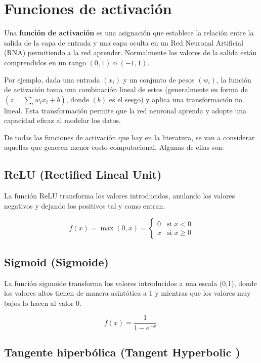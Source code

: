 \documentclass[
  us-letterpaper,
]{scrreprt}
\theoremstyle{plain}
\theoremstyle{definition}
\theoremstyle{definition}
\theoremstyle{remark}
\begin{document}
\section{Funciones de activación}\label{funciones-de-activaciuxf3n}

Una \textbf{función de activación} es una asignación que establece la
relación entre la salida de la capa de entrada y una capa oculta en un
Red Neuronal Artificial (RNA) permitiendo a la red aprender. Normalmente
los valores de la salida están comprendidos en un rango \((0,1)\) o
\((-1,1)\).

Por ejemplo, dada una entrada \((x_i)\) y un conjunto de pesos
\((w_i)\), la función de activación toma una combinación lineal de estos
(generalmente en forma de \((z = \sum_i w_i x_i + b)\), donde \((b)\) es
el sesgo) y aplica una transformación no lineal. Esta transformación
permite que la red neuronal aprenda y adopte una capacidad eficaz al
modelar los datos.

De todas las funciones de activación que hay en la literatura, se van a
considerar aquellas que generen menor costo computacional. Algunas de
ellas son:

\subsection{ReLU (Rectified Lineal Unit)}\label{sec-Relu}

La función ReLU transforma los valores introducidos, anulando los
valores negativos y dejando los positivos tal y como entran.

\[
f(x) = \max(0,x) = 
\left\{
\begin{array}{ll}
0 & \text{si } x < 0 \\
x & \text{si } x \geq 0
\end{array}
\right .
\]

\subsection{Sigmoid (Sigmoide)}\label{sigmoid-sigmoide}

La función sigmoide transforma los valores introducidos a una escala
(0,1), donde los valores altos tienen de manera asintótica a 1 y
mientras que los valores muy bajos lo hacen al valor 0.

\[ f(x)= \dfrac{1}{1- e^{-x}} .\]

\subsection{Tangente hiperbólica (Tangent Hyperbolic
)}\label{tangente-hiperbuxf3lica-tangent-hyperbolic}
\end{document}
